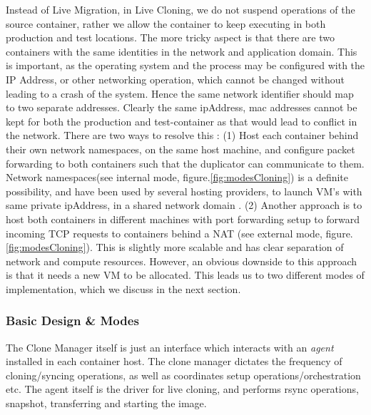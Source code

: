 Instead of Live Migration, in Live Cloning, we do not suspend operations of the source container, rather we allow the container to keep executing in both production and test locations.
The more tricky aspect is that there are two containers with the same identities in the network and application domain. 
This is important, as the operating system and the process may be configured with the IP Address, or other networking operation, which cannot be changed without leading to a crash of the system.
Hence the same network identifier should map to two separate addresses.
Clearly the same ipAddress, mac addresses cannot be kept for both the production and test-container as that would lead to conflict in the network. 
There are two ways to resolve this : 
(1) Host each container behind their own network namespaces, on the same host machine, and configure packet forwarding to both containers such that the duplicator can communicate to them. 
Network namespaces(see internal mode, figure.\ref{fig:modesCloning}) is a definite possibility, and have been used by several hosting providers, to launch VM's with same private ipAddress, in a shared network domain \cite{OpenStack}. 
(2) Another approach is to host both containers in different machines with port forwarding setup to forward incoming TCP requests to containers behind a NAT (see external mode, figure.\ref{fig:modesCloning}). 
This is slightly more scalable and has clear separation of network and compute resources. 
However, an obvious downside to this approach is that it needs a new VM to be allocated.
This leads us to two different modes of implementation, which we discuss in the next section.


\subsubsection{Basic Design \& Modes}

The Clone Manager itself is just an interface which interacts with an \textit{agent} installed in each container host.
The clone manager dictates the frequency of cloning/syncing operations, as well as  coordinates setup operations/orchestration etc.
The agent itself is the driver for live cloning, and performs rsync operations, snapshot, transferring and starting the image.

